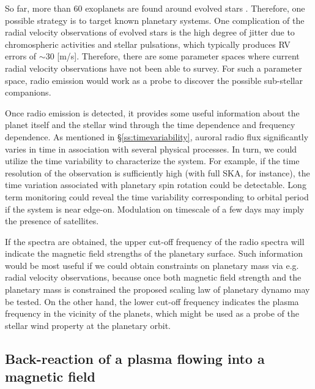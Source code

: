 \documentclass[iop,numberedappendix,apj]{emulateapj}
\begin{document}
So far, more than 60 exoplanets are found around evolved stars \citep[e.g.][and references therein]{trifonov2015}. 
Therefore, one possible strategy is to target known planetary systems.  
One complication of the radial velocity observations of evolved stars is the high degree of jitter due to chromospheric activities and stellar pulsations, which typically produces RV errors of $\sim 30$ [m/s]. 
Therefore, there are some parameter spaces where current radial velocity observations have not been able to survey. For such a parameter space, radio emission would work as a  probe to discover the possible sub-stellar companions. 

Once radio emission is detected, it provides some useful information about the planet itself and the stellar wind through the time dependence and frequency dependence. 
As mentioned in \S\ref{ss:timevariability}, auroral radio flux significantly varies in time in association with several physical processes. In turn, we could utilize the time variability to characterize the system. For example, if the time resolution of the observation is sufficiently high (with full SKA, for instance), the time variation associated with planetary spin rotation could be detectable. 
Long term monitoring could reveal the time variability corresponding to orbital period if the system is near edge-on. Modulation on timescale of a few days may imply the presence of satellites. 

If the spectra are obtained, the upper cut-off frequency of the radio spectra will indicate the magnetic field strengths of the planetary surface. Such information would be most useful if we could obtain constraints on planetary mass via e.g. radial velocity observations, because once both magnetic field strength and the planetary mass is constrained the proposed scaling law of planetary dynamo may be tested. On the other hand, the lower cut-off frequency indicates the plasma frequency in the vicinity of the planets, which might be used as a probe of the stellar wind property at the planetary orbit. 


\subsection{Back-reaction of a plasma flowing into a magnetic field}
\label{ss:offset}
\end{document}
